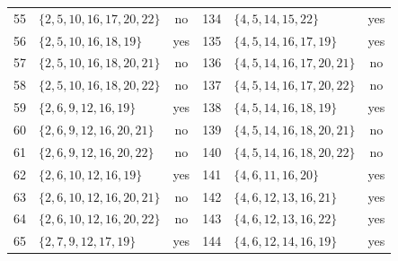 \documentclass[aps,pra,reprint,superscriptaddress,longbibliography,nofootinbib,floatfix,10pt]{revtex4-2}
\theoremstyle{definition}
\begin{document}
\begin{longtable}{rlc@{\qquad}rlc}
55 & $\{2,\allowbreak 5,\allowbreak 10,\allowbreak 16,\allowbreak 17,\allowbreak 20,\allowbreak 22\}$ & no & 134 & $\{4,\allowbreak 5,\allowbreak 14,\allowbreak 15,\allowbreak 22\}$ & yes\\
56 & $\{2,\allowbreak 5,\allowbreak 10,\allowbreak 16,\allowbreak 18,\allowbreak 19\}$ & yes & 135 & $\{4,\allowbreak 5,\allowbreak 14,\allowbreak 16,\allowbreak 17,\allowbreak 19\}$ & yes\\
57 & $\{2,\allowbreak 5,\allowbreak 10,\allowbreak 16,\allowbreak 18,\allowbreak 20,\allowbreak 21\}$ & no & 136 & $\{4,\allowbreak 5,\allowbreak 14,\allowbreak 16,\allowbreak 17,\allowbreak 20,\allowbreak 21\}$ & no\\
58 & $\{2,\allowbreak 5,\allowbreak 10,\allowbreak 16,\allowbreak 18,\allowbreak 20,\allowbreak 22\}$ & no & 137 & $\{4,\allowbreak 5,\allowbreak 14,\allowbreak 16,\allowbreak 17,\allowbreak 20,\allowbreak 22\}$ & no\\
59 & $\{2,\allowbreak 6,\allowbreak 9,\allowbreak 12,\allowbreak 16,\allowbreak 19\}$ & yes & 138 & $\{4,\allowbreak 5,\allowbreak 14,\allowbreak 16,\allowbreak 18,\allowbreak 19\}$ & yes\\
60 & $\{2,\allowbreak 6,\allowbreak 9,\allowbreak 12,\allowbreak 16,\allowbreak 20,\allowbreak 21\}$ & no & 139 & $\{4,\allowbreak 5,\allowbreak 14,\allowbreak 16,\allowbreak 18,\allowbreak 20,\allowbreak 21\}$ & no\\
61 & $\{2,\allowbreak 6,\allowbreak 9,\allowbreak 12,\allowbreak 16,\allowbreak 20,\allowbreak 22\}$ & no & 140 & $\{4,\allowbreak 5,\allowbreak 14,\allowbreak 16,\allowbreak 18,\allowbreak 20,\allowbreak 22\}$ & no\\
62 & $\{2,\allowbreak 6,\allowbreak 10,\allowbreak 12,\allowbreak 16,\allowbreak 19\}$ & yes & 141 & $\{4,\allowbreak 6,\allowbreak 11,\allowbreak 16,\allowbreak 20\}$ & yes\\
63 & $\{2,\allowbreak 6,\allowbreak 10,\allowbreak 12,\allowbreak 16,\allowbreak 20,\allowbreak 21\}$ & no & 142 & $\{4,\allowbreak 6,\allowbreak 12,\allowbreak 13,\allowbreak 16,\allowbreak 21\}$ & yes\\
64 & $\{2,\allowbreak 6,\allowbreak 10,\allowbreak 12,\allowbreak 16,\allowbreak 20,\allowbreak 22\}$ & no & 143 & $\{4,\allowbreak 6,\allowbreak 12,\allowbreak 13,\allowbreak 16,\allowbreak 22\}$ & yes\\
65 & $\{2,\allowbreak 7,\allowbreak 9,\allowbreak 12,\allowbreak 17,\allowbreak 19\}$ & yes & 144 & $\{4,\allowbreak 6,\allowbreak 12,\allowbreak 14,\allowbreak 16,\allowbreak 19\}$ & yes\\

\end{longtable}
\end{document}
